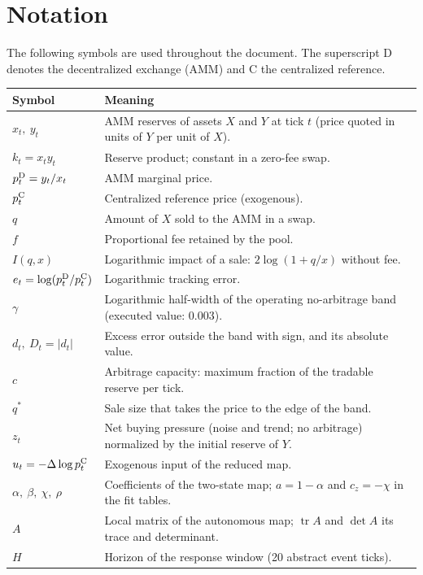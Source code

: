 \chapter*{Notation}

The following symbols are used throughout the document. The superscript $\mathrm{D}$ denotes the decentralized exchange (AMM) and $\mathrm{C}$ the centralized reference.

\begin{center}
\small
\begin{tabularx}{\textwidth}{@{}l X@{}}
\toprule
Symbol & Meaning \\
\midrule
$x_t,\ y_t$ & AMM reserves of assets $X$ and $Y$ at tick $t$ (price quoted in units of $Y$ per unit of $X$). \\
$k_t = x_t y_t$ & Reserve product; constant in a zero-fee swap. \\
$p^{\mathrm{D}}_t = y_t/x_t$ & AMM marginal price. \\
$p^{\mathrm{C}}_t$ & Centralized reference price (exogenous). \\
$q$ & Amount of $X$ sold to the AMM in a swap. \\
$f$ & Proportional fee retained by the pool. \\
$I(q,x)$ & Logarithmic impact of a sale: $2\log(1+q/x)$ without fee. \\
$e_t = \log(p^{\mathrm{D}}_t/p^{\mathrm{C}}_t)$ & Logarithmic tracking error. \\
$\gamma$ & Logarithmic half-width of the operating no-arbitrage band (executed value: $0.003$). \\
$d_t,\ D_t = |d_t|$ & Excess error outside the band with sign, and its absolute value. \\
$c$ & Arbitrage capacity: maximum fraction of the tradable reserve per tick. \\
$q^{\ast}$ & Sale size that takes the price to the edge of the band. \\
$z_t$ & Net buying pressure (noise and trend; no arbitrage) normalized by the initial reserve of $Y$. \\
$u_t = -\Delta\log p^{\mathrm{C}}_t$ & Exogenous input of the reduced map. \\
$\alpha,\ \beta,\ \chi,\ \rho$ & Coefficients of the two-state map; $a = 1-\alpha$ and $c_z = -\chi$ in the fit tables. \\
$A$ & Local matrix of the autonomous map; $\operatorname{tr}A$ and $\det A$ its trace and determinant. \\
$H$ & Horizon of the response window (20 abstract event ticks). \\

\end{tabularx}
\end{center}

